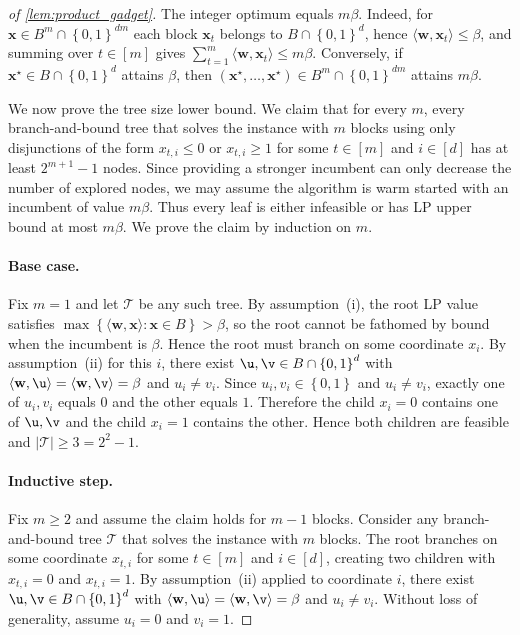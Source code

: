 \documentclass[smallextended,envcountsect]{svjour3} %
\let\ACCu\u
\let\ACCv\v
\newcommand{\set}[1]{\left\{#1\right\}}
\newcommand{\x}{\mathbf{x}}
\newcommand{\w}{\mathbf{w}}
\renewcommand{\u}{\mathbf{u}}
\renewcommand{\v}{\mathbf{v}}
\newcommand{\Tcal}{\mathcal{T}}
\newcommand{\0}{\mathbf{0}}
\newcommand{\1}{\mathbf{1}} %
\let\u\ACCu
\let\v\ACCv
\begin{document}
\begin{proof}[of \cref{lem:product_gadget}]
	The integer optimum equals $m\beta$.
	Indeed, for $\x\in B^m\cap\set{0,1}^{dm}$ each block $\x_t$ belongs to $B\cap\set{0,1}^d$, hence $\langle\w,\x_t\rangle\le\beta$, and summing over $t\in[m]$ gives $\sum_{t=1}^m\langle\w,\x_t\rangle\le m\beta$.
	Conversely, if $\x^\star\in B\cap\set{0,1}^d$ attains $\beta$, then $(\x^\star,\dots,\x^\star)\in B^m\cap\set{0,1}^{dm}$ attains $m\beta$.

	We now prove the tree size lower bound.
	We claim that for every $m$, every branch-and-bound tree that solves the instance with $m$ blocks using only disjunctions  %
    of the form $x_{t,i}\le 0$ or $x_{t,i}\ge 1$ for some $t \in [m]$ and $i \in [d]$
    has at least $2^{m+1}-1$ nodes.
	Since providing a stronger incumbent can only decrease the number of explored nodes, we may assume the algorithm is warm started with an incumbent of value $m\beta$.
	Thus every leaf is either infeasible or has LP upper bound at most $m\beta$.
	We prove the claim by induction on $m$.

\paragraph{Base case.}
	Fix $m=1$ and let $\Tcal$ be any such tree.
	By assumption~(i), the root LP value satisfies $\max\set{\langle\w,\x\rangle:\x\in B}>\beta$, so the root cannot be fathomed by bound when the incumbent is $\beta$.
	Hence the root must branch on some coordinate $x_i$.
	By assumption~(ii) for this $i$, there exist $\u,\v\in B\cap\set{0,1}^d$ with
	$\langle\w,\u\rangle=\langle\w,\v\rangle=\beta$ and $u_i\neq v_i$.
	Since $u_i,v_i\in\set{0,1}$ and $u_i\neq v_i$, exactly one of $u_i,v_i$ equals $0$ and the other equals $1$.
	Therefore the child $x_i=0$ contains one of $\u,\v$ and the child $x_i=1$ contains the other.
	Hence both children are feasible and $|\Tcal|\ge 3=2^{2}-1$.

\paragraph{Inductive step.}
	Fix $m\ge 2$ and assume the claim holds for $m-1$ blocks.
	Consider any branch-and-bound tree $\Tcal$ that solves the instance with $m$ blocks.
	The root branches on some coordinate $x_{t,i}$ for some $t\in[m]$ and $i\in[d]$, creating two children with $x_{t,i}=0$ and $x_{t,i}=1$.
	By assumption~(ii) applied to coordinate $i$, there exist $\u,\v\in B\cap\set{0,1}^d$ with
	$\langle\w,\u\rangle=\langle\w,\v\rangle=\beta$ and $u_i\neq v_i$.
	Without loss of generality, assume $u_i=0$ and $v_i=1$.


\end{proof}
\end{document}
